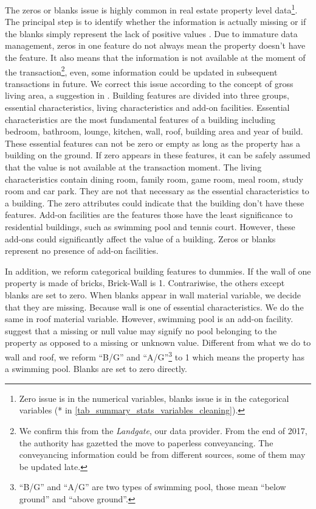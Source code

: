 \documentclass[12pt,a4paper]{article}
\begin{document}
\noindent The zeros or blanks issue is highly common in real estate property level data\footnote{Zero issue is in the numerical variables, blanks issue is in the categorical variables (* in \autoref{tab_summary_stats_variables_cleaning}).}. The principal step is to identify whether the information is actually missing or if the blanks simply represent the lack of positive values \citep{krause_lipscomb16}. Due to immature data management, zeros in one feature do not always mean the property doesn't have the feature. It also means that the information is not available at the moment of the transaction\footnote{We confirm this from the \textit{Landgate}, our data provider. From the end of 2017, the authority has gazetted the move to paperless conveyancing. The conveyancing information could be from different sources, some of them may be updated late.}, even, some information could be updated in subsequent transactions in future. We correct this issue according to the concept of gross living area, a suggestion in \citep{krause_lipscomb16}. Building features are divided into three groups, essential characteristics, living characteristics and add-on facilities. Essential characteristics are the most fundamental features of a building including bedroom, bathroom, lounge, kitchen, wall, roof, building area and year of build. These essential features can not be zero or empty as long as the property has a building on the ground. If zero appears in these features, it can be safely assumed that the value is not available at the transaction moment. The living characteristics contain dining room, family room, game room, meal room, study room and car park. They are not that necessary as the essential characteristics to a building. The zero attributes could indicate that the building don't have these features. Add-on facilities are the features those have the least significance to residential buildings, such as swimming pool and tennis court. However, these add-ons could significantly affect the value of a building. Zeros or blanks represent no presence of add-on facilities.

\noindent In addition, we reform categorical building features to dummies. If the wall of one property is made of bricks, Brick-Wall is 1. Contrariwise, the others except blanks are set to zero. When blanks appear in wall material variable, we decide that they are missing. Because wall is one of essential characteristics. We do the same in roof material variable. However, swimming pool is an add-on facility. \citet{krause_lipscomb16} suggest that a missing or null value may signify no pool belonging to the property as opposed to a missing or unknown value. Different from what we do to wall and roof, we reform ``B/G'' and ``A/G''\footnote{``B/G'' and ``A/G'' are two types of swimming pool, those mean ``below ground'' and ``above ground''.} to 1 which means the property has a swimming pool. Blanks are set to zero directly.   
\end{document}
